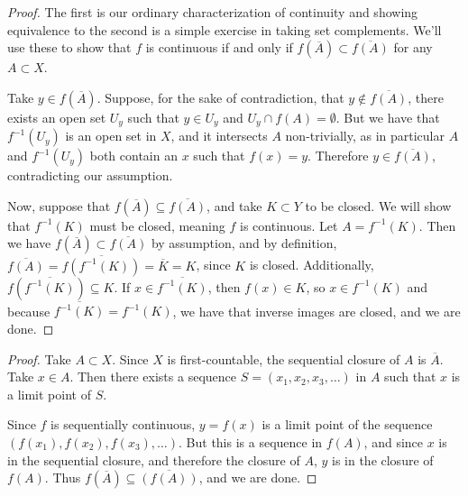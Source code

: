 \begin{proof}
	
The first is our ordinary characterization of continuity and showing equivalence to the second is a simple exercise in taking set complements.  We'll use these to show that $f$ is continuous if and only if $f(\overline{A}) \subset \overline{f(A)}$ for any $A\subset X$.

Take $y\in f(\overline{A})$.  Suppose, for the sake of contradiction, that $y\notin \overline{f(A)}$, there exists an open set $U_y$ such that $y\in U_y$ and $U_y \cap f(A) = \emptyset$.  But we have that $f^{-1}(U_y)$ is an open set in $X$, and it intersects $A$ non-trivially, as in particular $A$ and $f^{-1}(U_y)$ both contain an $x$ such that $f(x)=y$.  Therefore $y\in \overline{f(A)}$, contradicting our assumption.

Now, suppose that $f(\overline{A})\subseteq \overline{f(A)}$, and take $K\subset Y$ to be closed.  We will show that $f^{-1}(K)$ must be closed, meaning $f$ is continuous.  Let $A=f^{-1}(K)$.  Then we have $f(\overline{A})\subset\overline{f(A)}$ by assumption, and by definition, $\overline{f(A)}=\overline{f(f^{-1}(K))}=\overline{K} = K$, since $K$ is closed.  Additionally, $f(\overline{f^{-1}(K)})\subseteq K$.  If $x\in \overline{f^{-1}(K)}$, then $f(x)\in K$, so $x\in f^{-1}(K)$ and because $\overline{f^{-1}(K)}=f^{-1}(K)$, we have that inverse images are closed, and we are done.
	
\end{proof}


\begin{proof}
	
	Take $A\subset X$.  Since $X$ is first-countable, the sequential closure of $A$ is $\overline A$.  Take $x\in A$.  Then there exists a sequence $S=(x_1,x_2,x_3,\dots)$ in $A$ such that $x$ is a limit point of $S$.
	
	Since $f$ is sequentially continuous, $y=f(x)$ is a limit point of the sequence $(f(x_1),f(x_2),f(x_3),\dots)$.  But this is a sequence in $f(A)$, and since $x$ is in the sequential closure, and therefore the closure of $A$, $y$ is in the closure of $f(A)$.  Thus $f(\overline{A})\subseteq \overline{(f(A))}$, and we are done.

	
	
	
\end{proof}





	
	